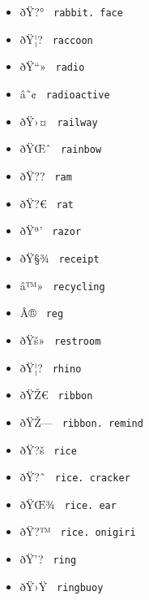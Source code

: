\begin{itemize}
\item
  \label{symbol-rabbit.face}{{ ðŸ?° }
  \texttt{\ rabbit.\ face\ }}
\item
  \label{symbol-raccoon}{{ ðŸ¦? } \texttt{\ raccoon\ }}
\item
  \label{symbol-radio}{{ ðŸ``» } \texttt{\ radio\ }}
\item
  \label{symbol-radioactive}{{ â˜¢ }
  \texttt{\ radioactive\ }}
\item
  \label{symbol-railway}{{ ðŸ›¤ } \texttt{\ railway\ }}
\item
  \label{symbol-rainbow}{{ ðŸŒˆ } \texttt{\ rainbow\ }}
\item
  \label{symbol-ram}{{ ðŸ?? } \texttt{\ ram\ }}
\item
  \label{symbol-rat}{{ ðŸ?€ } \texttt{\ rat\ }}
\item
  \label{symbol-razor}{{ ðŸª' } \texttt{\ razor\ }}
\item
  \label{symbol-receipt}{{ ðŸ§¾ } \texttt{\ receipt\ }}
\item
  \label{symbol-recycling}{{ â™» }
  \texttt{\ recycling\ }}
\item
  \label{symbol-reg}{{ Â® } \texttt{\ reg\ }}
\item
  \label{symbol-restroom}{{ ðŸš» } \texttt{\ restroom\ }}
\item
  \label{symbol-rhino}{{ ðŸ¦? } \texttt{\ rhino\ }}
\item
  \label{symbol-ribbon}{{ ðŸŽ€ } \texttt{\ ribbon\ }}
\item
  \label{symbol-ribbon.remind}{{ ðŸŽ--- }
  \texttt{\ ribbon.\ remind\ }}
\item
  \label{symbol-rice}{{ ðŸ?š } \texttt{\ rice\ }}
\item
  \label{symbol-rice.cracker}{{ ðŸ?˜ }
  \texttt{\ rice.\ cracker\ }}
\item
  \label{symbol-rice.ear}{{ ðŸŒ¾ }
  \texttt{\ rice.\ ear\ }}
\item
  \label{symbol-rice.onigiri}{{ ðŸ?™ }
  \texttt{\ rice.\ onigiri\ }}
\item
  \label{symbol-ring}{{ ðŸ'? } \texttt{\ ring\ }}
\item
  \label{symbol-ringbuoy}{{ ðŸ›Ÿ } \texttt{\ ringbuoy\ }}

\end{itemize}
